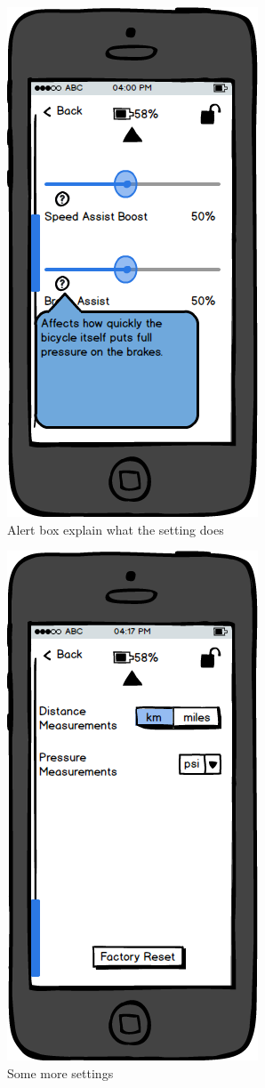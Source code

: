 \documentclass[a4paper]{report}
\begin{document}
\clearpage
\begin{figure}
\centering
\includegraphics[scale=0.9]{figures/prototype_1/settings_help_3}
\caption{Alert box explain what the setting does}
\end{figure}
\clearpage
\begin{figure}
\centering
\includegraphics[scale=0.9]{figures/prototype_1/settings_2}
\caption{Some more settings}
\end{figure}
\end{document}
